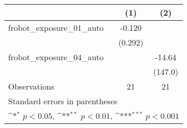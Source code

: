 {
\def\sym#1{\ifmmode^{#1}\else\(^{#1}\)\fi}
\begin{tabular}{l*{2}{c}}
\toprule
                    &\multicolumn{1}{c}{(1)}         &\multicolumn{1}{c}{(2)}         \\
\midrule
frobot\_exposure\_01\_auto&      -0.120         &                     \\
                    &     (0.292)         &                     \\
\addlinespace
frobot\_exposure\_04\_auto&                     &      -14.64         \\
                    &                     &     (147.0)         \\
\midrule
Observations        &          21         &          21         \\
\bottomrule
\multicolumn{3}{l}{\footnotesize Standard errors in parentheses}\\
\multicolumn{3}{l}{\footnotesize \sym{*} \(p<0.05\), \sym{**} \(p<0.01\), \sym{***} \(p<0.001\)}\\
\end{tabular}
}
